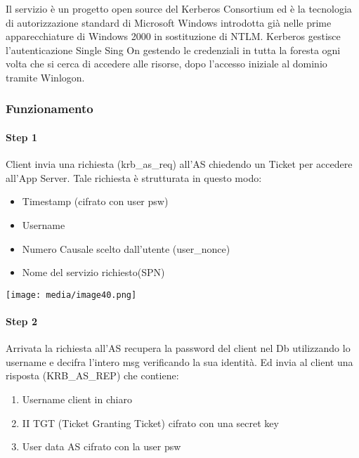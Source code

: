 Il servizio è un progetto open source del Kerberos Consortium ed è la
tecnologia di autorizzazione standard di Microsoft Windows introdotta
già nelle prime apparecchiature di Windows 2000 in sostituzione di NTLM.
Kerberos gestisce l'autenticazione Single Sing On gestendo le
credenziali in tutta la foresta ogni volta che si cerca di accedere alle
risorse, dopo l'accesso iniziale al dominio tramite Winlogon.

\subsubsection{Funzionamento}\label{funzionamento}

\paragraph{Step 1}\label{step-1}

Client invia una richiesta (krb\_as\_req) all'AS chiedendo un Ticket per
accedere all'App Server. Tale richiesta è strutturata in questo modo:

\begin{itemize}
\item
  Timestamp (cifrato con user psw)
\item
  Username
\item
  Numero Causale scelto dall'utente (user\_nonce)
\item
  Nome del servizio richiesto(SPN)
\end{itemize}

\texttt{[image: media/image40.png]}

\paragraph{Step 2}\label{step-2}

Arrivata la richiesta all'AS recupera la password del client nel Db
utilizzando lo username e decifra l'intero msg verificando la sua
identità. Ed invia al client una risposta (KRB\_AS\_REP) che contiene:

\begin{enumerate}
\def\labelenumi{\arabic{enumi}.}
\item
  Username client in chiaro
\item
  II TGT (Ticket Granting Ticket) cifrato con una secret key
\item
  User data AS cifrato con la user psw
\end{enumerate}

